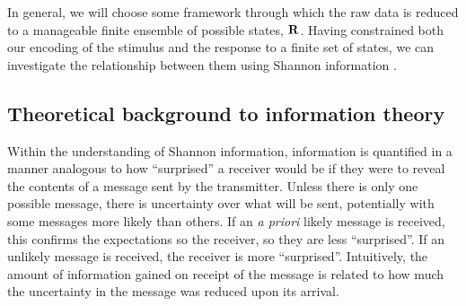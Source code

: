 
In general, we will choose some framework through which the raw data is reduced to a manageable finite ensemble of possible states, $\mathbf{R}$.
Having constrained both our encoding of the stimulus and the response to a finite set of states, we can investigate the relationship between them using Shannon information \citep{Shannon1948}.


\subsection{Theoretical background to information theory}

Within the understanding of Shannon information, information is quantified in a manner analogous to how ``surprised'' a receiver would be if they were to reveal the contents of a message sent by the transmitter.
Unless there is only one possible message, there is uncertainty over what will be sent, potentially with some messages more likely than others.
If an \textit{a priori} likely message is received, this confirms the expectations so the receiver, so they are less ``surprised''.
If an unlikely message is received, the receiver is more ``surprised''.
Intuitively, the amount of information gained on receipt of the message is related to how much the uncertainty in the message was reduced upon its arrival.

